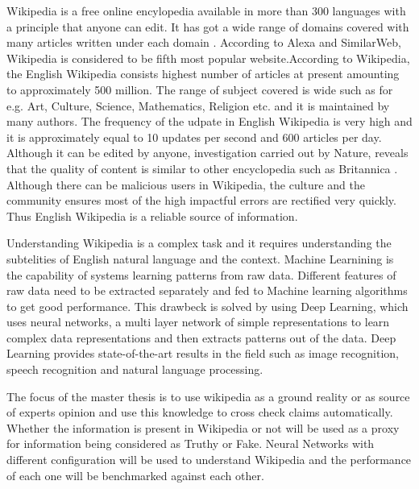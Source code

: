 \documentclass[a4paper, 11pt]{article}
\begin{document}
 Wikipedia is a free online encylopedia available in more than 300 languages with a principle that anyone can edit. It has got a wide range of domains covered with many articles written under each domain \cite{Wales2005}. According to Alexa and SimilarWeb, Wikipedia is considered to be fifth most popular website.According to Wikipedia, the English Wikipedia consists highest number of articles at present amounting to approximately 500 million. The range of subject covered is wide such as for e.g. Art, Culture, Science, Mathematics, Religion etc. and it is maintained by many authors. The frequency of the udpate in English Wikipedia is very high and it is approximately equal to 10 updates per second and 600 articles per day. Although it can be edited by anyone, investigation carried out by Nature, reveals that the quality of content is similar to other encyclopedia such as Britannica \cite{Wales2005}. Although there can be malicious users in Wikipedia, the culture and the community ensures most of the high impactful errors are rectified very quickly\cite{Priedhorsky2007}. Thus English Wikipedia is a reliable source of information.
 
Understanding Wikipedia is a complex task and it requires understanding the subtelities of English natural language and the context. Machine Learnining is the capability of systems learning patterns from raw data. Different features of raw data need to be extracted separately and fed to Machine learning algorithms to get good performance. This drawbeck is solved by using Deep Learning, which uses neural networks, a multi layer network of simple representations to learn complex data representations and then extracts patterns out of the data. Deep Learning provides state-of-the-art results in the field such as image recognition, speech recognition and natural language processing\cite{Goodfellow2016}.

The focus of the master thesis is to use wikipedia as a ground reality or as source of experts opinion and use this knowledge to cross check claims automatically. Whether the information is present in Wikipedia or not will be used as a proxy for information being considered as Truthy or Fake. Neural Networks with different configuration will be used to understand Wikipedia and the performance of each one will be benchmarked against each other. 
\end{document}
